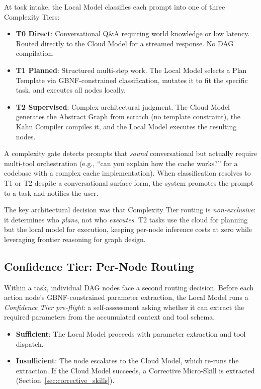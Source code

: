 \documentclass{article}
\begin{document}
At task intake, the Local Model classifies each prompt into one of three Complexity Tiers:

\begin{itemize}[leftmargin=*]
\item \textbf{T0 Direct}: Conversational Q\&A requiring world knowledge or low latency. Routed directly to the Cloud Model for a streamed response. No DAG compilation.
\item \textbf{T1 Planned}: Structured multi-step work. The Local Model selects a Plan Template via GBNF-constrained classification, mutates it to fit the specific task, and executes all nodes locally.
\item \textbf{T2 Supervised}: Complex architectural judgment. The Cloud Model generates the Abstract Graph from scratch (no template constraint), the Kahn Compiler compiles it, and the Local Model executes the resulting nodes.
\end{itemize}

A complexity gate detects prompts that \emph{sound} conversational but actually require multi-tool orchestration (e.g., ``can you explain how the cache works?'' for a codebase with a complex cache implementation). When classification resolves to T1 or T2 despite a conversational surface form, the system promotes the prompt to a task and notifies the user.

The key architectural decision was that Complexity Tier routing is \emph{non-exclusive}: it determines who \emph{plans}, not who \emph{executes}.
T2 tasks use the cloud for planning but the local model for execution, keeping per-node inference costs at zero while leveraging frontier reasoning for graph design.

\subsection{Confidence Tier: Per-Node Routing}
\label{sec:confidence_tier}

Within a task, individual DAG nodes face a second routing decision.
Before each action node's GBNF-constrained parameter extraction, the Local Model runs a \emph{Confidence Tier pre-flight}: a self-assessment asking whether it can extract the required parameters from the accumulated context and tool schema.

\begin{itemize}[leftmargin=*]
\item \textbf{Sufficient}: The Local Model proceeds with parameter extraction and tool dispatch.
\item \textbf{Insufficient}: The node escalates to the Cloud Model, which re-runs the extraction. If the Cloud Model succeeds, a Corrective Micro-Skill is extracted (Section~\ref{sec:corrective_skills}).
\end{itemize}
\end{document}
